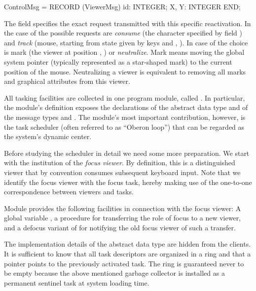 ControlMsg = RECORD (ViewerMsg)
  id: INTEGER;
  X, Y: INTEGER
END;
\endtt

\noindent The field  specifies the exact request transmitted with this
specific reactivation. In the case of  the possible
requests are \emph{consume} (the character specified by field ) and \emph{track} (mouse, starting from state given by keys and , ). In case of  the choice is mark (the viewer
at position , ) or \emph{neutralize}. Mark means moving the
global system pointer (typically represented as a star-shaped mark) to
the current position of the mouse. Neutralizing a viewer is equivalent
to removing all marks and graphical attributes from this viewer.

All tasking facilities are collected in one program module, called
. In particular, the module's definition exposes the
declarations of the abstract data type  and of the message types
 and . The module's most important contribution,
however, is the task scheduler (often referred to as ``Oberon loop'')
that can be regarded as the system's dynamic center.

Before studying the scheduler in detail we need some more
preparation. We start with the institution of the \emph{focus viewer}. By
definition, this is a distinguished viewer that by convention consumes
subsequent keyboard input. Note that we identify the focus viewer with
the focus task, hereby making use of the one-to-one correspondence
between viewers and tasks.

Module  provides the following facilities in connection with the
focus viewer: A global variable , a procedure  for
transferring the role of focus to a new viewer, and a defocus variant
of  for notifying the old focus viewer of such a transfer.

The implementation details of the abstract data type  are hidden
from the clients. It is sufficient to know that all task descriptors
are organized in a ring and that a pointer points to the previously
activated task. The ring is guaranteed never to be empty because the
above mentioned garbage collector is installed as a permanent sentinel
task at system loading time. %

